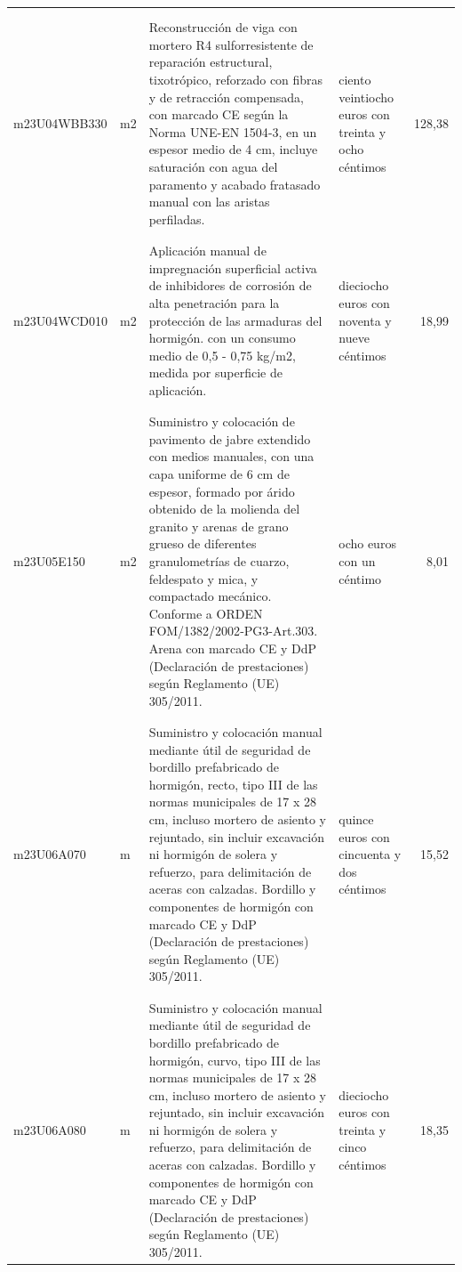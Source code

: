 \begin{supertabular}{|l|l|p{5cm}|p{3cm}|r|}
&&&&\\%
&&&&\\%
m23U04WBB330&m2&Reconstrucción de viga con mortero R4 sulforresistente de reparación estructural, tixotrópico, reforzado con fibras y de retracción compensada, con marcado CE según la Norma UNE{-}EN 1504{-}3, en un espesor medio de 4 cm, incluye saturación con agua del paramento y acabado fratasado manual con las aristas perfiladas.&ciento veintiocho euros con treinta y ocho céntimos&128,38\\%
&&&&\\%
&&&&\\%
m23U04WCD010&m2&Aplicación manual de impregnación superficial activa de inhibidores de corrosión de alta penetración para la protección de las armaduras del hormigón. con un consumo medio de 0,5 {-} 0,75 kg/m2, medida por superficie de aplicación.&dieciocho euros con noventa y nueve céntimos&18,99\\%
&&&&\\%
&&&&\\%
m23U05E150&m2&Suministro y colocación de pavimento de jabre extendido con medios manuales, con una capa uniforme de 6 cm de espesor, formado por árido obtenido de la molienda del granito y arenas de grano grueso de diferentes granulometrías de cuarzo, feldespato y mica, y compactado mecánico. Conforme a ORDEN FOM/1382/2002{-}PG3{-}Art.303. Arena con marcado CE y DdP (Declaración de prestaciones) según Reglamento (UE) 305/2011.&ocho euros con un céntimo&8,01\\%
&&&&\\%
&&&&\\%
m23U06A070&m&Suministro y colocación manual mediante útil de seguridad de bordillo prefabricado de hormigón, recto, tipo III de las normas municipales de 17 x 28 cm, incluso mortero de asiento y rejuntado, sin incluir excavación ni hormigón de solera y refuerzo, para delimitación de aceras con calzadas. Bordillo y componentes de hormigón con marcado CE y DdP (Declaración de prestaciones) según Reglamento (UE) 305/2011.&quince euros con cincuenta y dos céntimos&15,52\\%
&&&&\\%
&&&&\\%
m23U06A080&m&Suministro y colocación manual mediante útil de seguridad de bordillo prefabricado de hormigón, curvo, tipo III de las normas municipales de 17 x 28 cm, incluso mortero de asiento y rejuntado, sin incluir excavación ni hormigón de solera y refuerzo, para delimitación de aceras con calzadas. Bordillo y componentes de hormigón con marcado CE y DdP (Declaración de prestaciones) según Reglamento (UE) 305/2011.&dieciocho euros con treinta y cinco céntimos&18,35\\%

\end{supertabular}
